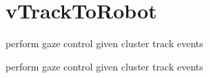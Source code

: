 \hypertarget{group__vTrackToRobot}{\section{v\-Track\-To\-Robot}
\label{group__vTrackToRobot}
}


perform gaze control given cluster track events  


perform gaze control given cluster track events 